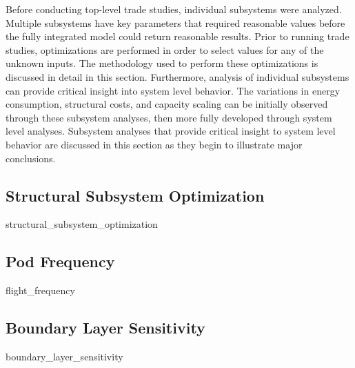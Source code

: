 Before conducting top-level trade studies, individual subsystems were
analyzed. Multiple subsystems have key parameters that required reasonable
values before the fully integrated model could return reasonable results.
Prior to running trade studies, optimizations are performed in order to select
values for any of the unknown inputs. The methodology used to perform these
optimizations is discussed in detail in this section. Furthermore, analysis of
individual subsystems can provide critical insight into system level behavior.
The variations in energy consumption, structural costs, and capacity scaling
can be initially observed through these subsystem analyses, then more fully
developed through system level analyses. Subsystem analyses that provide
critical insight to system level behavior are discussed in this section as
they begin to illustrate major conclusions.
\subsection{Structural Subsystem Optimization}
	{structural_subsystem_optimization}
\subsection{Pod Frequency}
	{flight_frequency}
\subsection{Boundary Layer Sensitivity}
	{boundary_layer_sensitivity}
